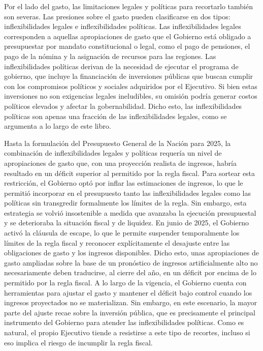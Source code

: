 \begin{introduction}
Por el lado del gasto, las limitaciones legales y políticas para recortarlo también son severas. Las presiones sobre el gasto pueden clasificarse en dos tipos: inflexibilidades legales e inflexibilidades políticas. Las inflexibilidades legales corresponden a aquellas apropiaciones de gasto que el Gobierno está obligado a presupuestar por mandato constitucional o legal, como el pago de pensiones, el pago de la nómina y la asignación de recursos para las regiones. Las inflexibilidades políticas derivan de la necesidad de ejecutar el programa de gobierno, que incluye la financiación de inversiones públicas que buscan cumplir con los compromisos políticos y sociales adquiridos por el Ejecutivo. Si bien estas inversiones no son exigencias legales ineludibles, su omisión podría generar costos políticos elevados y afectar la gobernabilidad. Dicho esto, las inflexibilidades políticas son apenas una fracción de las inflexibilidades legales, como se argumenta a lo largo de este libro.

Hasta la formulación del Presupuesto General de la Nación para 2025, la combinación de inflexibilidades legales y políticas requería un nivel de apropiaciones de gasto que, con una proyección realista de ingresos, habría resultado en un déficit superior al permitido por la regla fiscal. Para sortear esta restricción, el Gobierno optó por inflar las estimaciones de ingresos, lo que le permitió incorporar en el presupuesto tanto las inflexibilidades legales como las políticas sin transgredir formalmente los límites de la regla. Sin embargo, esta estrategia se volvió insostenible a medida que avanzaba la ejecución presupuestal y se deterioraba la situación fiscal y de liquidez. En junio de 2025, el Gobierno activó la cláusula de escape, lo que le permite suspender temporalmente los límites de la regla fiscal y reconocer explícitamente el desajuste entre las obligaciones de gasto y los ingresos disponibles.
Dicho esto, unas apropiaciones de gasto ampliadas sobre la base de un pronóstico de ingresos artificialmente alto no necesariamente deben traducirse, al cierre del año, en un déficit por encima de lo permitido por la regla fiscal. A lo largo de la vigencia, el Gobierno cuenta con herramientas para ajustar el gasto y mantener el déficit bajo control cuando los ingresos proyectados no se materializan. Sin embargo, en este escenario, la mayor parte del ajuste recae sobre la inversión pública, que es precisamente el principal instrumento del Gobierno para atender las inflexibilidades políticas. Como es natural, el propio Ejecutivo tiende a resistirse a este tipo de recortes, incluso si eso implica el riesgo de incumplir la regla fiscal.


\end{introduction}
